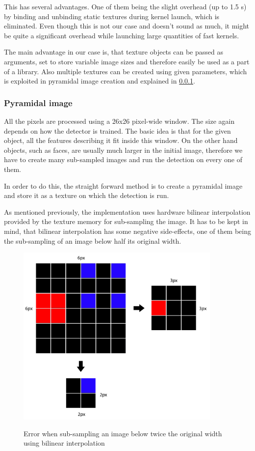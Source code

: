 This has several advantages. One of them being the slight overhead (up to 1.5 \mu s) by binding and unbinding static textures during kernel launch, which is eliminated. Even though this is not our case and doesn't sound as much, it might be quite a significant overhead while launching large quantities of fast kernels.

The main advantage in our case is, that texture objects can be passed as arguments, set to store variable image sizes and therefore easily be used as a part of a library. Also multiple textures can be created using given parameters, which is exploited in pyramidal image creation and explained in \ref{subsec:pyramidal}.

\subsubsection{Pyramidal image}\label{subsec:pyramidal}

All the pixels are processed using a 26x26 pixel-wide window. The size again depends on how the detector is trained. The basic idea is that for the given object, all the features describing it fit inside this window. On the other hand objects, such as faces, are usually much larger in the initial image, therefore we have to create many sub-sampled images and run the detection on every one of them.

In order to do this, the straight forward method is to create a pyramidal image and store it as a texture on which the detection is run.

As mentioned previously, the implementation uses hardware bilinear interpolation provided by the texture memory for sub-sampling the image. It has to be kept in mind, that bilinear interpolation has some negative side-effects, one of them being the sub-sampling of an image below half its original width.

\begin{center}
\begin{figure}[h]
	\centering\includegraphics[height=9cm]{fig/bilinear_error.pdf}\label{fig:bilinear-error}
	\caption{Error when sub-sampling an image below twice the original width using bilinear interpolation}
\end{figure}
\end{center}

